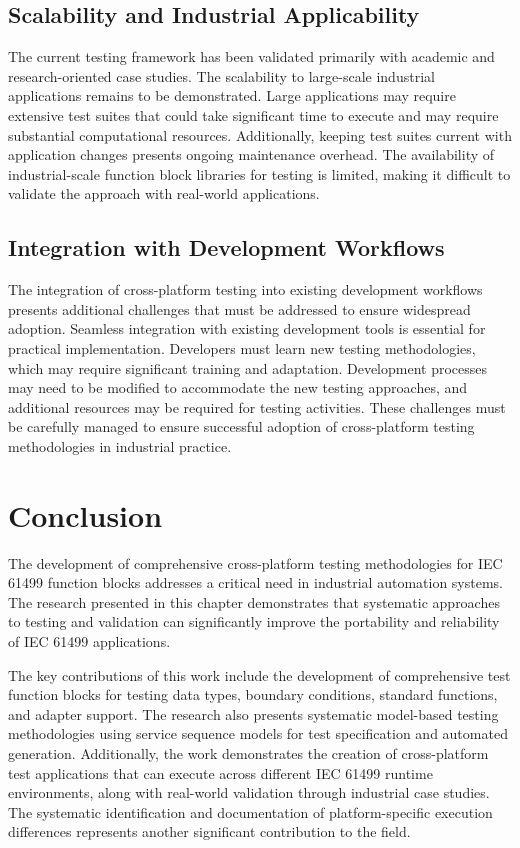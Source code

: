 \subsection{Scalability and Industrial Applicability}

The current testing framework has been validated primarily with academic and research-oriented case studies. The scalability to large-scale industrial applications remains to be demonstrated. Large applications may require extensive test suites that could take significant time to execute and may require substantial computational resources. Additionally, keeping test suites current with application changes presents ongoing maintenance overhead. The availability of industrial-scale function block libraries for testing is limited, making it difficult to validate the approach with real-world applications.

\subsection{Integration with Development Workflows}

The integration of cross-platform testing into existing development workflows presents additional challenges that must be addressed to ensure widespread adoption. Seamless integration with existing development tools is essential for practical implementation. Developers must learn new testing methodologies, which may require significant training and adaptation. Development processes may need to be modified to accommodate the new testing approaches, and additional resources may be required for testing activities. These challenges must be carefully managed to ensure successful adoption of cross-platform testing methodologies in industrial practice.

\section{Conclusion}

The development of comprehensive cross-platform testing methodologies for IEC 61499 function blocks addresses a critical need in industrial automation systems. The research presented in this chapter demonstrates that systematic approaches to testing and validation can significantly improve the portability and reliability of IEC 61499 applications.

The key contributions of this work include the development of comprehensive test function blocks for testing data types, boundary conditions, standard functions, and adapter support. The research also presents systematic model-based testing methodologies using service sequence models for test specification and automated generation. Additionally, the work demonstrates the creation of cross-platform test applications that can execute across different IEC 61499 runtime environments, along with real-world validation through industrial case studies. The systematic identification and documentation of platform-specific execution differences represents another significant contribution to the field.

